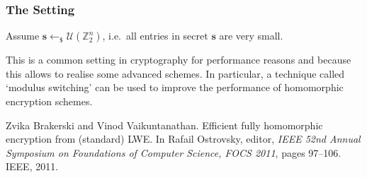\documentclass[10pt]{beamer}
\newcommand{\U}[1]{\ensuremath{\mathcal{U}(#1)\xspace}}
\renewcommand{\vec}[1]{\mathbf{#1}\xspace}
\newcommand{\Z}{\ensuremath{\mathbb{Z}}\xspace}
\newcommand{\sample}{\ensuremath{\leftarrow_{\$}}}
\begin{document}
\begin{frame}
\frametitle{The Setting}

Assume $\vec{s} \sample \U{\Z_2^n}$, i.e.\ all entries in secret $\vec{s}$ are very small.

\vspace{1em}

This is a common setting in cryptography for performance reasons and because this allows to realise some advanced schemes. In particular, a technique called `modulus switching' can be used to improve the performance of homomorphic encryption schemes.

\vspace{1em}

\begin{thebibliography}{foobar}
Zvika Brakerski and Vinod Vaikuntanathan.
\newblock Efficient fully homomorphic encryption from (standard) {LWE}.
\newblock In Rafail Ostrovsky, editor, {\em IEEE 52nd Annual Symposium on
  Foundations of Computer Science, FOCS 2011}, pages 97--106. IEEE, 2011.
\end{thebibliography}

\end{frame}
\end{document}
